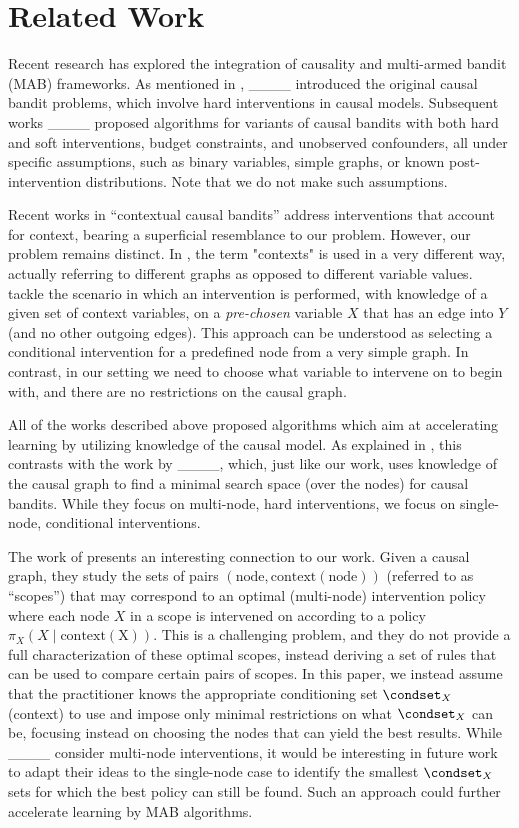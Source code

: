 \section{Related Work}
\label{sec:related-work}

Recent research has explored the integration of causality and multi-armed bandit (MAB) frameworks.
As mentioned in , ____ introduced the original causal bandit problems, which involve hard interventions in causal models.
Subsequent works ____ proposed algorithms for variants of causal bandits with both hard and soft interventions, budget constraints, and unobserved confounders, all under specific assumptions, such as binary variables, simple graphs, or known post-intervention distributions.
Note that we do not make such assumptions.

Recent works in ``contextual causal bandits'' address interventions that account for context, bearing a superficial resemblance to our problem.
However, our problem remains distinct.
In , the term "contexts" is used in a very different way, actually referring to different graphs as opposed to different variable values.
 tackle the scenario in which an intervention is performed, with knowledge of a given set of context variables, on a \emph{pre-chosen} variable $X$ that has an edge into $Y$ (and no other outgoing edges).
This approach can be understood as selecting a conditional intervention for a predefined node from a very simple graph.
In contrast, in our setting we need to choose what variable to intervene on to begin with, and there are no restrictions on the causal graph.

All of the works described above proposed algorithms which aim at accelerating learning by utilizing knowledge of the causal model.
As explained in , this contrasts with the work by ____, which, just like our work, uses knowledge of the causal graph to find a minimal search space (over the nodes) for causal bandits.
While they focus on multi-node, hard interventions, we focus on single-node, conditional interventions.

The work of  presents an interesting connection to our work.
Given a causal graph, they study the sets of pairs $(\mathrm{node}, \mathrm{context(node)})$ (referred to as ``scopes'') that may correspond to an optimal (multi-node) intervention policy where each node $X$ in a scope is intervened on according to a policy $\pi_{X}(X \mid \mathrm{context(X)})$.
This is a challenging problem, and they do not provide a full characterization of these optimal scopes, instead deriving a set of rules that can be used to compare certain pairs of scopes.
In this paper, we instead assume that the practitioner knows the appropriate conditioning set $\condset_{X}$ (context) to use and impose only minimal restrictions on what $\condset_{X}$ can be, focusing instead on choosing the nodes that can yield the best results.
While ____ consider multi-node interventions, it would be interesting in future work to adapt their ideas to the single-node case to identify the smallest $\condset_{X}$ sets for which the best policy can still be found.
Such an approach
could further accelerate learning by MAB algorithms.